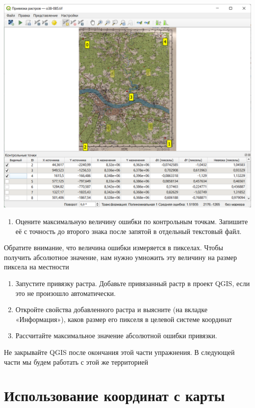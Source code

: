 \documentclass[
  12pt,
]{book}
\providecommand{\tightlist}{%
  \setlength{\itemsep}{0pt}\setlength{\parskip}{0pt}}
\begin{document}
\includegraphics{images/Ex05_Reference/RasterReference4.png}

\begin{enumerate}
\def\labelenumi{\arabic{enumi}.}
\setcounter{enumi}{5}
\tightlist
\item
  Оцените максимальную величину ошибки по контрольным точкам. Запишите её с точность до второго знака после запятой в отдельный текстовый файл.
\end{enumerate}

Обратите внимание, что величина ошибки измеряется в пикселах. Чтобы получить абсолютное значение, нам нужно умножить эту величину на размер пиксела на местности

\begin{enumerate}
\def\labelenumi{\arabic{enumi}.}
\setcounter{enumi}{6}
\item
  Запустите привязку растра. Добавьте привязанный растр в проект QGIS, если это не произошло автоматически.
\item
  Откройте свойства добавленного растра и выясните (на вкладке «Информация»), каков размер его пикселя в целевой системе координат
\item
  Рассчитайте максимальное значение абсолютной ошибки привязки.
\end{enumerate}

Не закрывайте QGIS после окончания этой части упражнения. В следующей части мы будем работать с этой же территорией

\hypertarget{raster-reference-frommap}{%
\section{Использование координат с карты}\label{raster-reference-frommap}}
\end{document}
